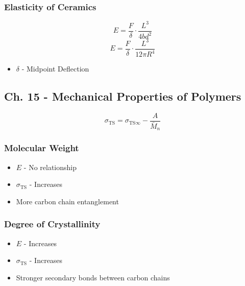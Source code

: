 		\subsubsection{Elasticity of Ceramics} \label{subsubsec:Ceramics Elasticity}
			\begin{equation}
				E = \frac{F}{\delta} \cdot \frac{L^{3}}{4bd^{2}}
			\end{equation}
			\begin{equation}
				E = \frac{F}{\delta} \cdot \frac{L^{3}}{12 \pi R^{4}}
			\end{equation}
			\begin{itemize}[noitemsep]
				\item $\delta$ - Midpoint Deflection
			\end{itemize}
		
		
	\subsection{Ch. 15 - Mechanical Properties of Polymers} \label{subsec:Ch15 Mechanical Properties of Polymers}
		\begin{equation}
			\sigma_{\text{TS}} = \sigma_{\text{TS}\infty} - \frac{A}{\bar{M}_{n}}
		\end{equation}
		\subsubsection{Molecular Weight} \label{subsubsec:Polymer Molecular Weight}
			\begin{itemize}[noitemsep]
				\item $E$ - No relationship
				\item $\sigma_{\text{TS}}$ - Increases
				\item More carbon chain entanglement
			\end{itemize}
		
		\subsubsection{Degree of Crystallinity} \label{subsubsec:Polymer Degree of Crystallinity}
			\begin{itemize}[noitemsep]
				\item $E$ - Increases
				\item $\sigma_{\text{TS}}$ - Increases
				\item Stronger secondary bonds between carbon chains
			\end{itemize}
		
